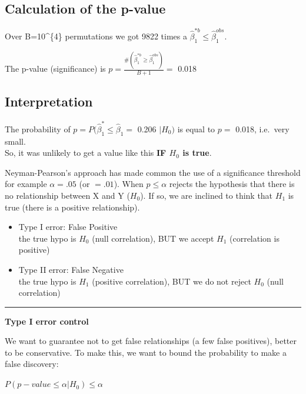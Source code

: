 \documentclass[]{article}
\providecommand{\tightlist}{%
  \setlength{\itemsep}{0pt}\setlength{\parskip}{0pt}}
\begin{document}
\subsection{Calculation of the
p-value}\label{calculation-of-the-p-value}

Over B=10\^{}\{4\} permutations we got 9822 times a
\(\hat{\beta}_1 ^{* b} \leq \hat{\beta}_1 ^{obs}\).

The p-value (significance) is
\(p=\frac{\# (\hat{\beta}_1 ^{* b} \geq \hat{\beta}_1 ^{obs})}{B + 1} =\)
0.018

\subsection{Interpretation}\label{interpretation}

The probability of \(p=P (\hat{\beta}_1 ^ * \leq \hat{\beta}_1=\) 0.206
\(| H_0)\) is equal to \(p =\) 0.018, i.e.~very small.\\
So, it was unlikely to get a value like this \textbf{IF \(H_0\) is
true}.

Neyman-Pearson's approach has made common the use of a significance
threshold for example \(\alpha=.05\) (or \(=. 01\)). When
\(p \leq \alpha\) rejects the hypothesis that there is no relationship
between X and Y (\(H_0\)). If so, we are inclined to think that \(H_1\)
is true (there is a positive relationship).

\begin{itemize}
\tightlist
\item
  Type I error: False Positive\\
  the true hypo is \(H_0\) (null correlation), BUT we accept \(H_1\)
  (correlation is positive)
\item
  Type II error: False Negative\\
  the true hypo is \(H_1\) (positive correlation), BUT we do not reject
  \(H_0\) (null correlation)
\end{itemize}

\begin{center}\rule{0.5\linewidth}{\linethickness}\end{center}

\textbf{Type I error control}

We want to guarantee not to get false relationships (a few false
positives), better to be conservative. To make this, we want to bound
the probability to make a false discovery:

\(P (p-value \leq \alpha | H_0) \leq \alpha\)
\end{document}

